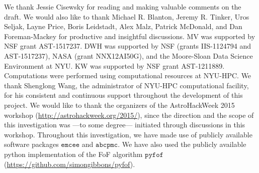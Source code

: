 We thank Jessie Cisewsky for reading and making valuable comments on the draft. We would also like to thank Michael R. Blanton, Jeremy R. Tinker, Uros Seljak, Layne Price, 
Boris Leidstadt, Alex Malz, Patrick McDonald, and Dan Foreman-Mackey for productive 
and insightful discussions. MV was supported by NSF grant AST-1517237. DWH was supported 
by NSF (grants IIS-1124794 and AST-1517237), NASA (grant NNX12AI50G), and the Moore-Sloan 
Data Science Environment at NYU. KW was supported by NSF grant AST-1211889. Computations 
were performed using computational resources at NYU-HPC. We thank Shenglong Wang, the 
administrator of NYU-HPC computational facility, for his consistent and continuous support 
throughout the development of this project. We would like to thank the organizers of 
the AstroHackWeek 2015 workshop (\url{http://astrohackweek.org/2015/}), 
since the direction and the scope of this investigation was ---to some degree--- initiated 
through discussions in this workshop. Throughout this investigation, we have made use of 
publicly available software packages $\mathtt{emcee}$ and $\mathtt{abcpmc}$. We have also used the publicly available python implementation of the FoF algorithm $\mathtt{pyfof}$ (\url{https://github.com/simongibbons/pyfof}).



